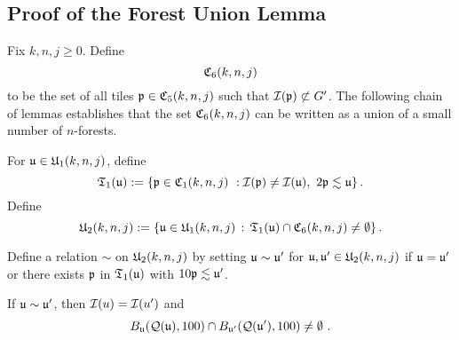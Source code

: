 \subsection{Proof of the Forest Union Lemma}
\label{subsecforest}

Fix $k,n,j\ge 0$.
Define
$$
    {\mathfrak C}_6(k,n,j)
$$
to be the set of all tiles ${\mathfrak p} \in {\mathfrak C}_5(k,n,j)$ such that ${\mathcal{I}}({\mathfrak p}) \not\subset G'$. The following chain of lemmas
establishes that the set ${\mathfrak C}_6(k,n,j)$ can be written as a union of a small number of $n$-forests.

For ${\mathfrak u}\in {\mathfrak U}_1(k,n,j)$, define
\begin{equation}
    \label{eq-T1-def}
    \mathfrak{T}_1({\mathfrak u}):= \{{\mathfrak p} \in {\mathfrak C}_1(k,n,j) \ : {\mathcal{I}}({\mathfrak p})\neq {\mathcal{I}}({\mathfrak u}), \ 2{\mathfrak p} \lesssim {\mathfrak u}\}\,.
\end{equation}
Define
\begin{equation}
    \label{eq-U2-def}
    {\mathfrak U}_2(k,n,j) := \{ {\mathfrak u} \in {\mathfrak U}_1(k,n,j) \, : \, \mathfrak{T}_1({\mathfrak u}) \cap {\mathfrak C}_6(k,n,j) \ne \emptyset\}\,.
\end{equation}

Define a relation $\sim$ on ${\mathfrak U}_2(k,n,j)$
by setting ${\mathfrak u}\sim {\mathfrak u}'$
for ${\mathfrak u},{\mathfrak u}'\in {\mathfrak U}_2(k,n,j)$
if ${\mathfrak u}={\mathfrak u}'$ or there exists ${\mathfrak p}$ in $\mathfrak{T}_1({\mathfrak u})$
with $10 {\mathfrak p}\lesssim {\mathfrak u}'$.

\begin{lemma}
    \label{relation-geometry}
    \leanok
    If ${\mathfrak u} \sim {\mathfrak u}'$, then ${\mathcal{I}}(u) = {\mathcal{I}}(u')$ and
    \begin{equation*}
        B_{{\mathfrak u}}({\mathcal{Q}}({\mathfrak u}), 100) \cap B_{{\mathfrak u}'}({\mathcal{Q}}({\mathfrak u}'), 100) \neq \emptyset\ .
    \end{equation*}
\end{lemma}

